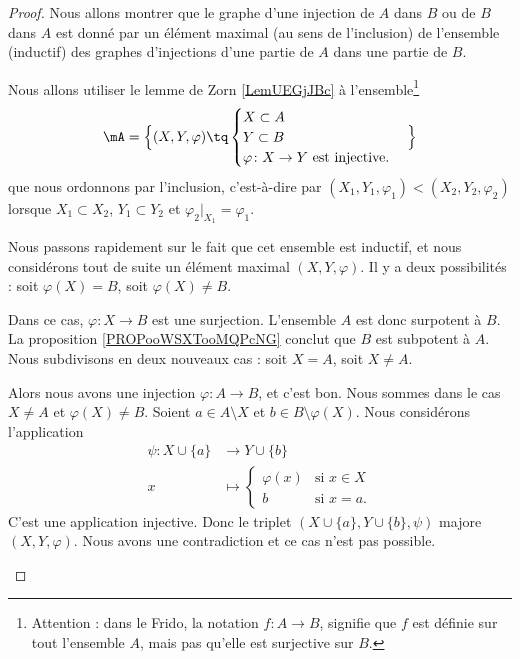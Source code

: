 \begin{proof}
	Nous allons montrer que le graphe d'une injection de \( A\) dans \( B\) ou de \( B\) dans \( A\) est donné par un élément maximal (au sens de l'inclusion) de l'ensemble (inductif) des graphes d'injections d'une partie de \( A\) dans une partie de \( B\).

	Nous allons utiliser le lemme de Zorn \ref{LemUEGjJBc} à l'ensemble\footnote{Attention : dans le Frido, la notation \( f\colon A\to B\), signifie que \( f\) est définie sur tout l'ensemble \( A\), mais pas qu'elle est surjective sur \( B\).}
	\begin{equation}
		\mA=\Big\{  (X,Y,\varphi)  \tq
		\begin{cases}
			X\subset A \\
			Y\subset B \\
			\varphi\colon X\to Y\text{ est injective.}
		\end{cases}
		\Big\}
	\end{equation}
	que nous ordonnons par l'inclusion, c'est-à-dire par \( (X_1,Y_1,\varphi_1)<(X_2,Y_2,\varphi_2)\) lorsque \( X_1\subset X_2\), \( Y_{1}\subset Y_2\) et \( \varphi_2|_{X_1}=\varphi_1\).

	Nous passons rapidement sur le fait que cet ensemble est inductif, et nous considérons tout de suite un élément maximal \( (X,Y,\varphi)\). Il y a deux possibilités : soit \( \varphi(X)=B\), soit \( \varphi(X)\neq B\).
	\begin{subproof}
		\spitem[Si \( \varphi(X)=B\)]
		Dans ce cas, \( \varphi\colon X\to B\) est une surjection. L'ensemble \( A\) est donc surpotent à \( B\). La proposition \ref{PROPooWSXTooMQPcNG} conclut que \( B\) est subpotent à \( A\).
		Nous subdivisons en deux nouveaux cas : soit \( X=A\), soit \( X\neq A\).
		\begin{subproof}
			\spitem[Si \( X=A\)]
			Alors nous avons une injection \( \varphi\colon A\to B\), et c'est bon.
			\spitem[Si \( X\neq A\)]
			Nous sommes dans le cas \( X\neq A\) et \( \varphi(X)\neq B\). Soient \( a\in A\setminus X\) et \( b\in B\setminus \varphi(X)\). Nous considérons l'application
			\begin{equation}
				\begin{aligned}
					\psi\colon X\cup\{ a \} & \to Y\cup\{ b \}                       \\
					x                       & \mapsto \begin{cases}
						                                  \varphi(x) & \text{si } x\in X \\
						                                  b          & \text{si }x=a.
					                                  \end{cases}
				\end{aligned}
			\end{equation}
			C'est une application injective. Donc le triplet \( (X\cup \{ a \}, Y\cup\{ b \},\psi)\) majore \( (X,Y,\varphi)\). Nous avons une contradiction et ce cas n'est pas possible.
		\end{subproof}
	\end{subproof}
\end{proof}

